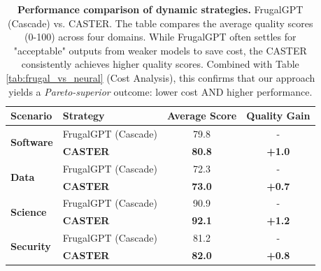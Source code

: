 \documentclass{article}
\theoremstyle{plain}
\theoremstyle{definition}
\theoremstyle{remark}
\begin{document}
\begin{table}[t]
    \centering
    \caption{\textbf{Performance comparison of dynamic strategies.} FrugalGPT (Cascade) vs. CASTER. The table compares the average quality scores (0-100) across four domains. While FrugalGPT often settles for "acceptable" outputs from weaker models to save cost, the CASTER consistently achieves higher quality scores. Combined with Table \ref{tab:frugal_vs_neural} (Cost Analysis), this confirms that our approach yields a \textit{Pareto-superior} outcome: lower cost AND higher performance.}
    \label{tab:frugal_vs_neural_performance}
    \begin{tabular}{llcc}
        \toprule
        \textbf{Scenario} & \textbf{Strategy} & \textbf{Average Score} & \textbf{Quality Gain} \\
        \midrule
        \multirow{2}{*}{\textbf{Software}} 
        & FrugalGPT (Cascade) & 79.8 & - \\ 
        & \textbf{CASTER} & \textbf{80.8} & \textbf{+1.0} \\ 
        \midrule
        \multirow{2}{*}{\textbf{Data}} 
        & FrugalGPT (Cascade) & 72.3& - \\ 
        & \textbf{CASTER} & \textbf{73.0}& \textbf{+0.7}\\ %
        \midrule
        \multirow{2}{*}{\textbf{Science}} 
        & FrugalGPT (Cascade) & 90.9 & - \\ 
        & \textbf{CASTER} & \textbf{92.1} & \textbf{+1.2} \\ 
        \midrule
        \multirow{2}{*}{\textbf{Security}} 
        & FrugalGPT (Cascade) & 81.2 & - \\ 
        & \textbf{CASTER} & \textbf{82.0} & \textbf{+0.8} \\ 
        \bottomrule
    \end{tabular}
\end{table}
\end{document}
